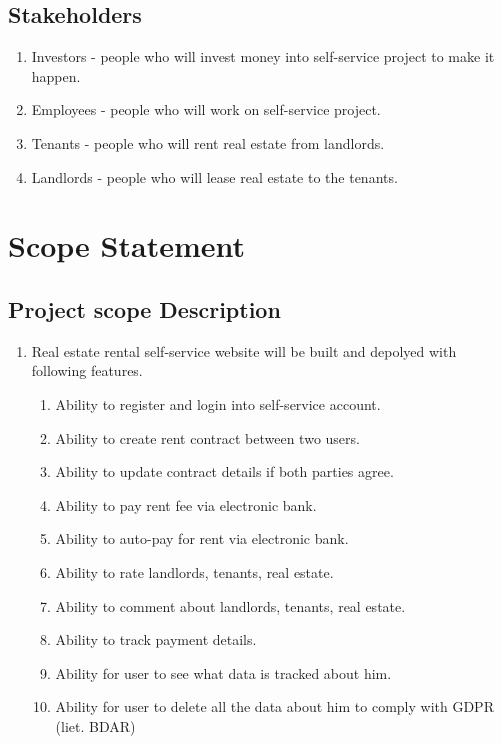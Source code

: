 \documentclass{VUMIFPSkursinis}
\begin{document}
	\subsection{Stakeholders}
		\begin{enumerate}
			\item{Investors - people who will invest money into self-service project to make it happen.}
			\item{Employees - people who will work on self-service project.}
			\item{Tenants - people who will rent real estate from landlords.}
			\item{Landlords - people who will lease real estate to the tenants.}
		\end{enumerate}


\section{Scope Statement}
	\subsection{Project scope Description}
		\begin{enumerate}
			\item{Real estate rental self-service website will be built and depolyed with following features.}
				\begin{enumerate}
					\item{Ability to register and login into self-service account.}
					\item{Ability to create rent contract between two users.}
					\item{Ability to update contract details if both parties agree.}
					\item{Ability to pay rent fee via electronic bank.}
					\item{Ability to auto-pay for rent via electronic bank.}
					\item{Ability to rate landlords, tenants, real estate.}
					\item{Ability to comment about landlords, tenants, real estate.}
					\item{Ability to track payment details.}
					\item{Ability for user to see what data is tracked about him.}
					\item{Ability for user to delete all the data about him to comply with GDPR (liet. BDAR)}
				\end{enumerate}
		\end{enumerate}
\end{document}
